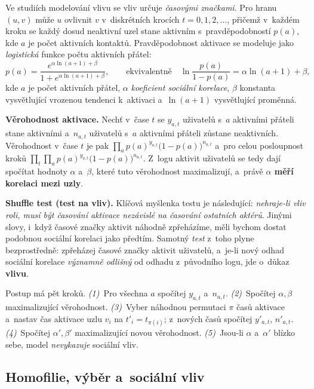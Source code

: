 \documentclass[11pt,a4paper]{article}
\theoremstyle{definition}
\begin{document}
\begin{defbox}
Ve studiích modelování vlivu se vliv určuje \emph{časovými značkami}. Pro hranu $(u,v)$ může
$u$ ovlivnit $v$ v~diskrétních krocích $t=0,1,2,\dots$, přičemž v~každém kroku se každý dosud
neaktivní uzel stane aktivním s~pravděpodobností $p(a)$, kde $a$ je počet aktivních kontaktů.
Pravděpodobnost aktivace se modeluje jako \emph{logistická} funkce počtu aktivních přátel:
\[ p(a)=\frac{e^{\alpha\ln(a+1)+\beta}}{1+e^{\alpha\ln(a+1)+\beta}},\qquad\text{ekvivalentně}\quad
   \ln\frac{p(a)}{1-p(a)}=\alpha\ln(a+1)+\beta, \]
kde $a$ je počet aktivních přátel, $\alpha$ \emph{koeficient sociální korelace}, $\beta$
konstanta vysvětlující vrozenou tendenci k~aktivaci a~$\ln(a+1)$ vysvětlující proměnná.

\textbf{Věrohodnost aktivace.} Nechť v~čase $t$ se $y_{a,t}$ uživatelů s~$a$ aktivními přáteli
stane aktivními a~$n_{a,t}$ uživatelů s~$a$ aktivními přáteli zůstane neaktivních. Věrohodnost
v~čase $t$ je pak $\prod_a p(a)^{y_{a,t}}\big(1-p(a)\big)^{n_{a,t}}$ a~pro celou posloupnost
kroků $\prod_t\prod_a p(a)^{y_{a,t}}\big(1-p(a)\big)^{n_{a,t}}$. Z~logu aktivit uživatelů se
tedy dají spočítat hodnoty $\alpha$ a~$\beta$, které tuto věrohodnost maximalizují, a~právě
\textbf{$\alpha$ měří korelaci mezi uzly}.

\textbf{Shuffle test (test na vliv).} Klíčová myšlenka testu je následující: \emph{nehraje-li
vliv roli, musí být časování aktivace nezávislé na časování ostatních aktérů}. Jinými slovy,
i~když časové značky aktivit náhodně zpřeházíme, měli bychom dostat podobnou sociální korelaci
jako předtím. Samotný \emph{test} z~toho plyne bezprostředně: zpřeházej časové značky aktivit
uživatelů, a~je-li nový odhad sociální korelace \emph{významně odlišný} od odhadu z~původního
logu, jde o~důkaz \textbf{vlivu}.

Postup má pět kroků. \emph{(1)}~Pro všechna $a$ spočítej $y_{a,t}$ a~$n_{a,t}$.
\emph{(2)}~Spočítej $\alpha,\beta$ maximalizující věrohodnost. \emph{(3)}~Vyber náhodnou
permutaci $\pi$ časů aktivace a~nastav čas aktivace uzlu $v_i$ na $t'_i=t_{\pi(i)}$; z~nových
časů spočítej $y'_{a,t}$, $n'_{a,t}$. \emph{(4)}~Spočítej $\alpha',\beta'$ maximalizující novou
věrohodnost. \emph{(5)}~Jsou-li $\alpha$ a~$\alpha'$ blízko sebe, model \emph{nevykazuje}
sociální vliv.
\end{defbox}

\subsection{Homofilie, výběr a~sociální vliv}
\end{document}
